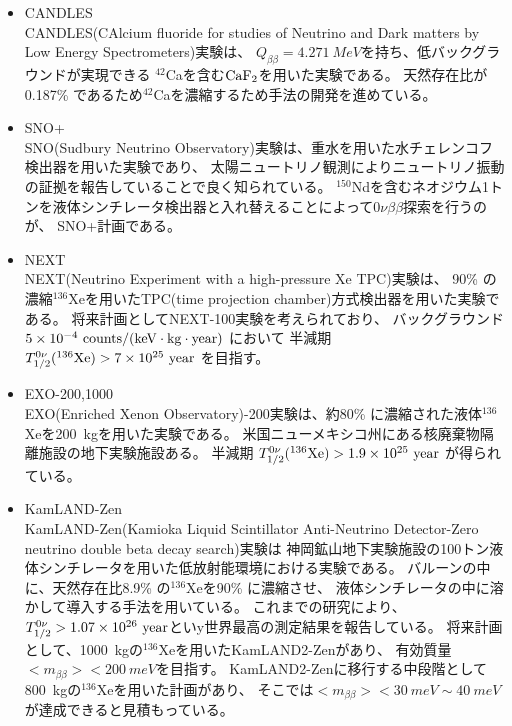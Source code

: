 \documentclass[a4paper,10pt]{jreport}
\begin{document}
\begin{itemize}
	\item CANDLES \\
	CANDLES(CAlcium fluoride for studies of Neutrino and Dark matters by Low Energy Spectrometers)実験は、
	$Q_{\beta\beta}=\SI{4.271}{MeV}$を持ち、低バックグラウンドが実現できる
	$^{42}$Caを含む$\rm{CaF_2}$を用いた実験である。
	天然存在比が0.187\% であるため$^{42}$Caを濃縮するため手法の開発を進めている\cite{CANDLES}。
	
	\item SNO+ \\
	SNO(Sudbury Neutrino Observatory)実験は、重水を用いた水チェレンコフ検出器を用いた実験であり、
	太陽ニュートリノ観測によりニュートリノ振動の証拠を報告していることで良く知られている。
	$^{150}$Ndを含むネオジウム1トンを液体シンチレータ検出器と入れ替えることによって$0\nu\beta\beta$探索を行うのが、
	SNO+計画である。
	
	\item NEXT \\
	 NEXT(Neutrino Experiment with a high-pressure Xe TPC)実験は、
	 90\% の濃縮$^{136}$Xeを用いたTPC(time projection chamber)方式検出器を用いた実験である。
	 将来計画としてNEXT-100実験を考えられており、
	 バックグラウンド $5 \times 10^{-4} \ \rm{ counts/(keV \cdot kg \cdot year)}$
	 において
	 半減期 $T_{1/2}^{0\nu}(^{136}\rm{Xe}) > 7 \times 10^{25} \ \rm{year}$
	 を目指す\cite{NEXT}。
	
	\item EXO-200,1000 \\
	EXO(Enriched Xenon Observatory)-200実験は、約80\% に濃縮された液体$^{136}$Xeを\SI{200}{kg}を用いた実験である。
	米国ニューメキシコ州にある核廃棄物隔離施設の地下実験施設ある。
	半減期 $T_{1/2}^{0\nu}(^{136}\rm{Xe}) > 1.9 \times 10^{25} \ \rm{year}$
	が得られている\cite{EXO}。
	
	\item KamLAND-Zen \\
	KamLAND-Zen(Kamioka Liquid Scintillator Anti-Neutrino Detector-Zero neutrino double beta decay search)実験は
	神岡鉱山地下実験施設の100トン液体シンチレータを用いた低放射能環境における実験である。
	バルーンの中に、天然存在比8.9\% の$^{136}$Xeを90\% に濃縮させ、
	液体シンチレータの中に溶かして導入する手法を用いている。
	これまでの研究により、$T_{1/2}^{0\nu}>1.07\times10^{26}\ \rm{year}$といy世界最高の測定結果を報告している\cite{KamLAND-Zen-result}。
	将来計画として、\SI{1000}{kg}の$^{136}$Xeを用いたKamLAND2-Zenがあり、
	有効質量 $< m_{\beta\beta} > < \SI{200}{meV}$を目指す。
	KamLAND2-Zenに移行する中段階として\SI{800}{kg}の$^{136}$Xeを用いた計画があり、
	そこでは$< m_{\beta\beta} > < \SI{30}{meV} \sim \SI{40}{meV}$が達成できると見積もっている\cite{KamLAND-Zen}。
	
\end{itemize}
\end{document}
